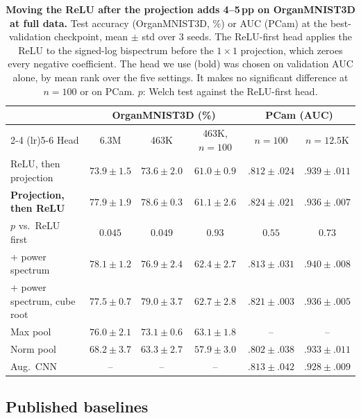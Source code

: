\documentclass{article}
\theoremstyle{definition}
\theoremstyle{remark}
\theoremstyle{definition}
\begin{document}
\begin{table}[h]
  \centering
  \caption{\textbf{Moving the ReLU after the projection adds 4--5\,pp on
    OrganMNIST3D at full data.} Test accuracy (OrganMNIST3D, \%) or AUC (PCam) at the
    best-validation checkpoint, mean $\pm$ std over 3 seeds. The ReLU-first head applies the
    ReLU to the signed-log bispectrum before the $1{\times}1$ projection, which zeroes every
    negative coefficient. The head we use (bold) was chosen on validation AUC alone, by
    mean rank over the five settings. It makes no significant difference at $n{=}100$ or on
    PCam. $p$: Welch test against the ReLU-first head.}
  \label{tab:head-ablation}
  \small
  \setlength{\tabcolsep}{3pt}
  \begin{tabular*}{\linewidth}{@{\extracolsep{\fill}}lccccc@{}}
    \toprule
    & \multicolumn{3}{c}{OrganMNIST3D (\%)} & \multicolumn{2}{c}{PCam (AUC)} \\
    \cmidrule(lr){2-4} \cmidrule(lr){5-6}
    Head & 6.3M & 463K & 463K, $n{=}100$ & $n{=}100$ & $n{=}12.5$K \\
    \midrule
    ReLU, then projection & $73.9 {\pm} 1.5$ & $73.6 {\pm} 2.0$ & $61.0 {\pm} 0.9$ & $.812 {\pm} .024$ & $.939 {\pm} .011$ \\
    \textbf{Projection, then ReLU} & $\mathbf{77.9 {\pm} 1.9}$ & $\mathbf{78.6 {\pm} 0.3}$ & $\mathbf{61.1 {\pm} 2.6}$ & $\mathbf{.824 {\pm} .021}$ & $\mathbf{.936 {\pm} .007}$ \\
    \quad $p$ vs.\ ReLU first & $0.045$ & $0.049$ & $0.93$ & $0.55$ & $0.73$ \\
    \quad + power spectrum & $78.1 {\pm} 1.2$ & $76.9 {\pm} 2.4$ & $62.4 {\pm} 2.7$ & $.813 {\pm} .031$ & $.940 {\pm} .008$ \\
    \quad + power spectrum, cube root & $77.5 {\pm} 0.7$ & $79.0 {\pm} 3.7$ & $62.7 {\pm} 2.8$ & $.821 {\pm} .003$ & $.936 {\pm} .005$ \\
    \midrule
    Max pool & $76.0 {\pm} 2.1$ & $73.1 {\pm} 0.6$ & $63.1 {\pm} 1.8$ & -- & -- \\
    Norm pool & $68.2 {\pm} 3.7$ & $63.3 {\pm} 2.7$ & $57.9 {\pm} 3.0$ & $.802 {\pm} .038$ & $.933 {\pm} .011$ \\
    Aug.\ CNN & -- & -- & -- & $.813 {\pm} .042$ & $.928 {\pm} .009$ \\
    \bottomrule
  \end{tabular*}
\end{table}

\subsection{Published baselines}
\end{document}
